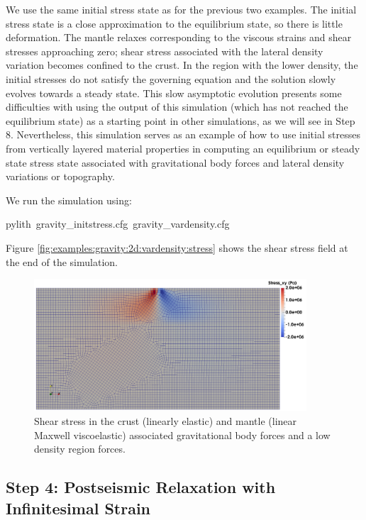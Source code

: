We use the same initial stress state as for the previous two examples.
The initial stress state is a close approximation to the equilibrium
state, so there is little deformation. The mantle relaxes corresponding
to the viscous strains and shear stresses approaching zero; shear
stress associated with the lateral density variation becomes confined
to the crust. In the region with the lower density, the initial stresses
do not satisfy the governing equation and the solution slowly evolves
towards a steady state. This slow asymptotic evolution presents some
difficulties with using the output of this simulation (which has not
reached the equilibrium state) as a starting point in other simulations,
as we will see in Step 8. Nevertheless, this simulation serves as
an example of how to use initial stresses from vertically layered
material properties in computing an equilibrium or steady state stress
state associated with gravitational body forces and lateral density
variations or topography.

We run the simulation using:
\begin{lyxcode}
pylith~gravity\_initstress.cfg~gravity\_vardensity.cfg
\end{lyxcode}
Figure \vref{fig:examples:gravity:2d:vardensity:stress} shows the
shear stress field at the end of the simulation.

\begin{figure}
\begin{centering}
\includegraphics[width=4in]{tutorials/grav2d/figs/gravity_vardensity-shearstress}
\par\end{centering}

\caption{Shear stress in the crust (linearly elastic) and mantle (linear Maxwell
viscoelastic) associated gravitational body forces and a low density
region forces.\label{fig:examples:gravity:2d:vardensity:stress}}
\end{figure}



\subsection{Step 4: Postseismic Relaxation with Infinitesimal Strain}


